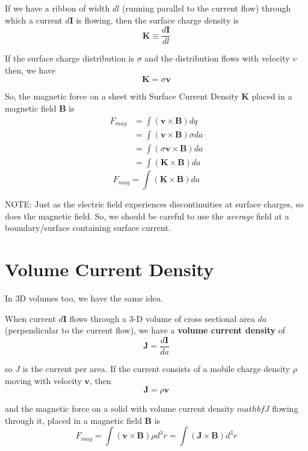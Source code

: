 \documentclass[12pt]{report}
\begin{document}
If we have a ribbon of width $dl$ (running parallel to the current flow) through which a current $d\mathbf{I}$ is flowing, then the surface charge density is 
\[ \boxed{\mathbf{K} \equiv \frac{d\mathbf{I}}{dl}} \]

If the surface charge distribution is $\sigma$ and the distribution flows with velocity $v$ then, we have
\[ \mathbf{K} = \sigma \mathbf{v} \]

So, the magnetic force on a sheet with Surface Current Density $\mathbf{K}$ placed in a magnetic field $\mathbf{B}$ is 
\begin{align*}
    F_{mag} &= \int (\mathbf{v} \times \mathbf{B}) dq \\
            &= \int (\mathbf{v} \times \mathbf{B}) \sigma da \\
            &= \int (\sigma \mathbf{v} \times \mathbf{B}) da \\
            &= \int (\mathbf{K} \times \mathbf{B}) da 
\end{align*}
\[ \boxed{F_{mag} = \int (\mathbf{K} \times \mathbf{B}) da } \]

NOTE: Just as the electric field experiences discontinuities at surface charges, so does the magnetic field. So, we should be careful to use the \emph{average} field at a boundary/surface containing surface current.

\section{Volume Current Density}

In 3D volumes too, we have the same idea. 

When current $d\mathbf{I}$ flows through a 3-D volume of cross sectional area $da$ (perpendicular to the current flow), we have a \textbf{volume current density} of 
\[ \mathbf{J} = \frac{d\mathbf{I}}{da} \]

so $J$ is the current per area. If the current consists of a mobile charge density $\rho$ moving with velocity $\mathbf{v}$, then 
\[ \mathbf{J} = \rho \mathbf{v} \]

and the magnetic force on a solid with volume current density $mathbf{J}$ flowing through it, placed in a magnetic field $\mathbf{B}$ is
\[ F_{mag} = \int (\mathbf{v} \times \mathbf{B}) \rho d^3r = \int (\mathbf{J} \times \mathbf{B}) d^3r \]

\printbibliography
\end{document}
